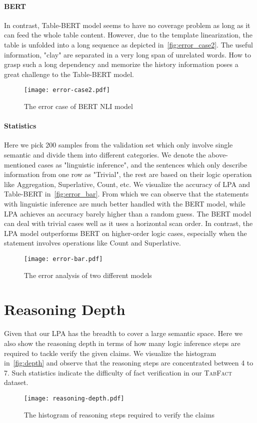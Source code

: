 \documentclass{article} \usepackage{iclr2020_conference,times}
\begin{document}
\paragraph{BERT}
In contrast, Table-BERT model seems to have no coverage problem as long as it can feed the whole table content. However, due to the template linearization, the table is unfolded into a long sequence as depicted in~\autoref{fig:error_case2}. The useful information, "clay" are separated in a very long span of unrelated words. How to grasp such a long dependency and memorize the history information poses a great challenge to the Table-BERT model.
\begin{figure}[thb]
    \centering
    \texttt{[image: error-case2.pdf]}
    \caption{The error case of BERT NLI model}
    \label{fig:error_case2}
\end{figure}
\paragraph{Statistics}
Here we pick 200 samples from the validation set which only involve single semantic and divide them into different categories. We denote the above-mentioned cases as "linguistic inference", and the sentences which only describe information from one row as "Trivial", the rest are based on their logic operation like Aggregation, Superlative, Count, etc. We visualize the accuracy of LPA and Table-BERT in~\autoref{fig:error_bar}. From which we can observe that the statements with linguistic inference are much better handled with the BERT model, while LPA achieves an accuracy barely higher than a random guess. The BERT model can deal with trivial cases well as it uses a horizontal scan order. In contrast, the LPA model outperforms BERT on higher-order logic cases, especially when the statement involves operations like Count and Superlative. 
\begin{figure}[thb]
    \centering
    \texttt{[image: error-bar.pdf]}
    \caption{The error analysis of two different models}
    \label{fig:error_bar}
\end{figure}

\section{Reasoning Depth}
Given that our LPA has the breadth to cover a large semantic space. Here we also show the reasoning depth in terms of how many logic inference steps are required to tackle verify the given claims. We visualize the histogram in~\autoref{fig:depth} and observe that the reasoning steps are concentrated between 4 to 7. Such statistics indicate the difficulty of fact verification in our \textsc{TabFact} dataset.
\begin{figure}[thb]
    \centering
    \texttt{[image: reasoning-depth.pdf]}
    \caption{The histogram of reasoning steps required to verify the claims}
    \label{fig:depth}
\end{figure}
\end{document}
